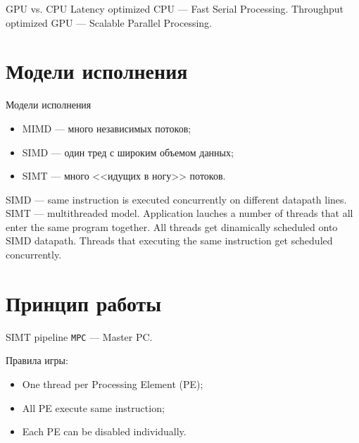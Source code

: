 \begin{frame}{GPU vs. CPU}
Latency optimized CPU --- Fast Serial Processing.
\vfill
Throughput optimized GPU --- Scalable Parallel Processing.
\end{frame}

\section{Модели исполнения}

\begin{frame}{Модели исполнения}
\begin{itemize}
    \item MIMD --- много независимых потоков;
    \item SIMD --- один тред с широким объемом данных;
    \item SIMT --- много <<идущих в ногу>> потоков.
\end{itemize}
\vfill
SIMD --- same instruction is executed concurrently on different datapath lines.
\vfill
SIMT --- multithreaded model. Application lauches a number of threads that all
enter the same program together. All threads get dinamically scheduled onto
SIMD datapath. Threads that executing the same instruction get scheduled
concurrently.
\end{frame}

\section{Принцип работы}

\begin{frame}{SIMT pipeline}
\centering
{}
\vfill
\texttt{MPC} --- Master PC.
\end{frame}

\begin{frame}
Правила игры:
\begin{itemize}
    \item One thread per Processing Element (PE);
    \item All PE execute same instruction;
    \item Each PE can be disabled individually.
\end{itemize}
\end{frame}

